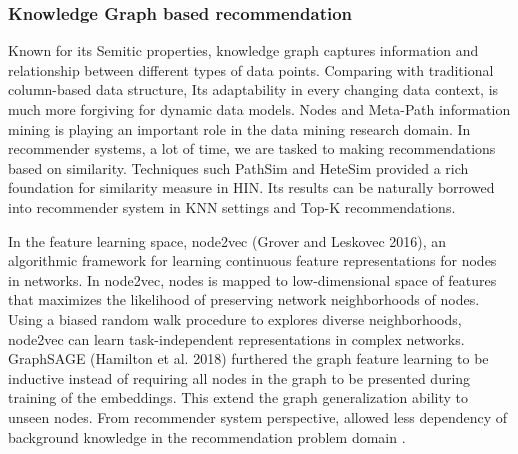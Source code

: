 





\subsubsection{Knowledge Graph based recommendation}
Known for its Semitic properties, knowledge graph captures information and relationship between different types of data points. Comparing with traditional column-based data structure, Its adaptability in every changing data context, is much more forgiving for dynamic data models. Nodes and Meta-Path information mining is playing an important role in the data mining research domain. In recommender systems, a lot of time, we are tasked to making recommendations based on similarity. Techniques such PathSim \citep{Sun2011PathSim} and HeteSim \citep{Shi2013HeteSim} provided a rich foundation for similarity measure in HIN. Its results can be naturally borrowed into recommender system in KNN settings and Top-K recommendations. 

In the feature learning space, node2vec (Grover and Leskovec 2016), an algorithmic framework for learning continuous feature representations for nodes in networks. In node2vec, nodes is mapped to low-dimensional space of features that maximizes the likelihood of preserving network neighborhoods of nodes. Using a biased random walk procedure to explores diverse neighborhoods, node2vec can learn task-independent representations in complex networks. GraphSAGE (Hamilton et al. 2018) furthered the graph feature learning to be inductive instead of requiring all nodes in the graph to be presented during training of the embeddings. This extend the graph generalization ability to unseen nodes. From recommender system perspective, allowed less dependency of background knowledge in the recommendation problem domain \citep{Hu2018}.  

